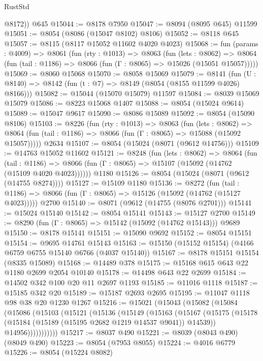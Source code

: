 \begin{lexlean}{RustStd}
\begin{coremodule}
        @8172))
    @645
@15044 := @8178 @7950
@15047 := @8094 (@8095 @645) @11599
@15051 := @8054 (@8086 (@15047 @8102) @8106)
@15052 := @8118 @645
@15057 := @8115 (@8117 @15052 @11602 @4020 @4023)
@15068 := fun (params : @4009) =>
  @8061
    (fun (rty : @1013) =>
    @8063
      (fun (lets : @8062) =>
      @8064 (fun (tail : @1186) => @8066 (fun (Γ : @8065) => @15026 (@15051 @15057)))))
@15069 := @8060 @15068
@15070 := @8058 @15069
@15079 := @8141
    (fun (U : @8140) => @8142 (fun (t : @7) => @8149 (@8054 (@8155 @11599 @4026) @8166)))
@15082 := @15044 (@15070 @15079) @11597
@15084 := @8039 @15069 @15079
@15086 := @8223 @15068 @1407
@15088 := @8054 (@15024 @9614)
@15089 := @15047 @9617
@15090 := @8086 @15089
@15092 := @8054 (@15090 @8106)
@15103 := @8226
    (fun (rty : @1013) =>
    @8063
      (fun (lets : @8062) =>
      @8064 (fun (tail : @1186) => @8066 (fun (Γ : @8065) => @15088 (@15092 @15057)))))
    @2634
@15107 := @8054 (@15024 (@8071 (@9612 @14756)))
@15109 := @14763 @15052 @11602
@15121 := @8248
    (fun (lets : @8062) =>
    @8064
      (fun (tail : @1186) =>
      @8066 (fun (Γ : @8065) => @15107 (@15092 (@14762 (@15109 @4020 @4023))))))
    @1180
@15126 := @8054 (@15024 (@8071 (@9612 (@14755 @8274))))
@15127 := @15109 @1180
@15136 := @8272
    (fun (tail : @1186) => @8066 (fun (Γ : @8065) => @15126 (@15092 (@14762 (@15127 @4023)))))
    @2700
@15140 := @8071 (@9612 (@14755 (@8076 @2701)))
@15141 := @15024 @15140
@15142 := @8054 @15141
@15143 := @15127 @2700
@15149 := @8290 (fun (Γ : @8065) => @15142 (@15092 (@14762 @15143))) @9689
@15150 := @8178 @15141
@15151 := @15090 @9692
@15152 := @8054 @15151
@15154 := @9695 @14761 @15143
@15163 := @15150 (@15152 @15154) (@4166 @6759 @6755 @15140 @6766 (@4037 @15140))
@15167 := @8178 @15151 @15154 (@8335 @15089)
@15168 := @14489 @378
@15175 := @15168 @615 @643 @22 @1180 @2699 @2054 @10140
@15178 := @14498 @643 @22 @2699
@15184 := @14502 @342 @100 @20 @11 @2697 @1193
@15185 := @11016 @1118
@15187 := @15185 @342 @20
@15189 := @15187 @2693 @2695
@15195 := @11047 @1118 @98 @38 @20 @1230 @1267
@15216 := @15021
    (@15043
      (@15082
        (@15084
          (@15086
            (@15103
              (@15121
                (@15136
                  (@15149
                    (@15163
                      (@15167
                        (@15175
                          (@15178 (@15184 (@15189 (@15195 @2682 @1219 @14537 @9041)) @14539))
                          @14956)))))))))))
@15217 := @8037 @490
@15221 := @8039 (@8043 @490) (@8049 @490)
@15223 := @8054 (@7953 @8055)
@15224 := @4016 @6779
@15226 := @8054 (@15224 @8082)

\end{coremodule}
\end{lexlean}
